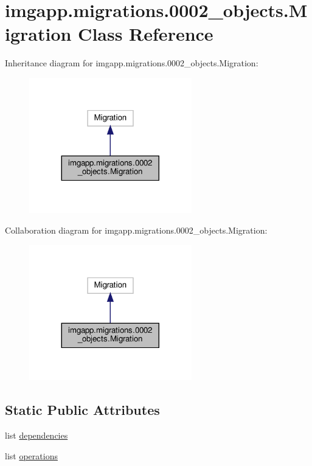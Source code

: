 \hypertarget{classimgapp_1_1migrations_1_10002__objects_1_1Migration}{}\section{imgapp.\+migrations.0002\+\_\+objects.Migration Class Reference}
\label{classimgapp_1_1migrations_1_10002__objects_1_1Migration}


Inheritance diagram for imgapp.\+migrations.0002\+\_\+objects.Migration\+:\nopagebreak
\begin{figure}[H]
\begin{center}
\leavevmode
\includegraphics[width=200pt]{classimgapp_1_1migrations_1_10002__objects_1_1Migration__inherit__graph}
\end{center}
\end{figure}


Collaboration diagram for imgapp.\+migrations.0002\+\_\+objects.Migration\+:\nopagebreak
\begin{figure}[H]
\begin{center}
\leavevmode
\includegraphics[width=200pt]{classimgapp_1_1migrations_1_10002__objects_1_1Migration__coll__graph}
\end{center}
\end{figure}
\subsection*{Static Public Attributes}
\begin{DoxyCompactItemize}
\item 
list \hyperlink{classimgapp_1_1migrations_1_10002__objects_1_1Migration_abd3fa170eb3a3149ee43f9acf33917b4}{dependencies}
\item 
list \hyperlink{classimgapp_1_1migrations_1_10002__objects_1_1Migration_adcbef6b10dcf430fa1e7ce7f4a9b700a}{operations}
\end{DoxyCompactItemize}


